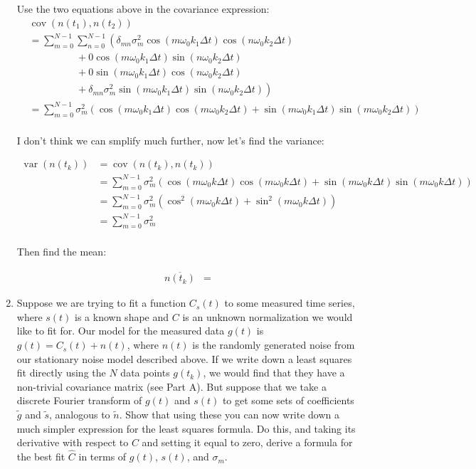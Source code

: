 \begin{enumerate}[label=\textbf{\Alph*}.]
    Use the two equations above in the covariance expression:
    \begin{align*}
        &\operatorname{cov}(n(t_1), n(t_2)) \\
        &= \sum_{m=0}^{N-1} \sum_{n=0}^{N-1} \left(\delta_{mn}\sigma_m^2\cos(m\omega_0 k_1\Delta t)\cos(n\omega_0 k_2\Delta t)\right. \\
        &\hspace{2cm}+ 0\cos(m\omega_0 k_1\Delta t)\sin(n\omega_0 k_2\Delta t) \\
        &\hspace{2cm}+ 0\sin(m\omega_0 k_1\Delta t)\cos(n\omega_0 k_2\Delta t) \\
        &\hspace{2cm}+\left.\delta_{mn}\sigma_m^2 \sin(m\omega_0 k_1\Delta t)\sin(n\omega_0 k_2\Delta t)\right) \\
        &= \sum_{m=0}^{N-1} \sigma_m^2\left(\cos(m\omega_0 k_1\Delta t)\cos(m\omega_0 k_2\Delta t) + \sin(m\omega_0 k_1\Delta t)\sin(m\omega_0 k_2\Delta t)\right) \\
    \end{align*}

    I don't think we can smplify much further, now let's find the variance:

    \begin{align*}
        \operatorname{var}(n(t_k)) &=\operatorname{cov}(n(t_k), n(t_k)) \\
        &= \sum_{m=0}^{N-1} \sigma_m^2\left(\cos(m\omega_0 k\Delta t)\cos(m\omega_0 k\Delta t) + \sin(m\omega_0 k\Delta t)\sin(m\omega_0 k\Delta t)\right) \\
        &= \sum_{m=0}^{N-1} \sigma_m^2\left(\cos^2(m\omega_0 k\Delta t) + \sin^2(m\omega_0 k\Delta t)\right) \\
        &= \sum_{m=0}^{N-1} \sigma_m^2 \\
    \end{align*}

    Then find the mean:

    \begin{align*}
        \overline{n(t_k)} &= 
    \end{align*}


    \item Suppose we are trying to fit a function $C_s(t)$ to some measured time series, where $s(t)$ is a known shape and $C$ is an unknown normalization we would like to fit for. Our model for the measured data $g(t)$ is $g(t) = C_s(t) + n(t)$, where $n(t)$ is the randomly generated noise from our stationary noise model described above. If we write down a least squares fit directly using the $N$ data points $g(t_k)$, we would find that they have a non-trivial covariance matrix (see Part A). But suppose that we take a discrete Fourier transform of $g(t)$ and $s(t)$ to get some sets of coefficients $\tilde{g}$ and $\tilde{s}$, analogous to $\tilde{n}$. Show that using these you can now write down a much simpler expression for the least squares formula. Do this, and taking its derivative with respect to $C$ and setting it equal to zero, derive a formula for the best fit $\hat{C}$ in terms of $g(t)$, $s(t)$, and $\sigma_m$.

\end{enumerate}
